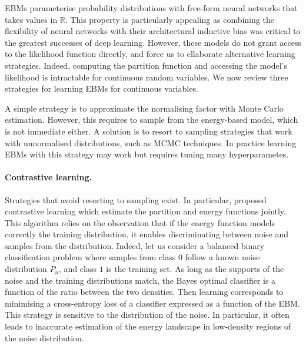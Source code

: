 EBMs parameterise probability distributions with free-form neural networks that takes values in $\mathbb{R}$. This property is particularly appealing as combining the flexibility of neural networks with their architectural inductive bias was critical to the greatest successes of deep learning. However, these models do not grant access to the likelihood function directly, and force us to ellaborate alternative learning strategies. Indeed, computing the partition function and accessing the model's likelihood is intractable for continuous random variables. We now review three strategies for learning EBMs for continuous variables.

A simple strategy is to approximate the normalising factor with Monte Carlo estimation. However, this requires to sample from the energy-based model, which is not immediate either. A solution is to resort to sampling strategies that work with unnormalised distributions, such as MCMC techniques. In practice learning EBMs with this strategy may work but requires tuning many hyperparametes.

\paragraph{Contrastive learning.}
Strategies that avoid resorting to sampling exist. In particular, \citet{gutmann2012noise} proposed contrastive learning which estimate the partition and energy functions jointly. This algorithm relies on the observation that if the energy function models correctly the training distribution, it enables discriminating between noise and samples from the distribution. Indeed, let us consider a balanced binary classification problem where samples from class $0$ follow a known noise distribution $P_n$, and class $1$ is the training set. As long as the supports of the noise and the training distributions match, the Bayes optimal classifier is a function of the ratio between the two densities. Then learning corresponds to minimising a cross-entropy loss of a classifier expressed as a function of the EBM. This strategy is sensitive to the distribution of the noise. In particular, it often leads to inaccurate estimation of the energy landscape in low-density regions of the noise distribution.

